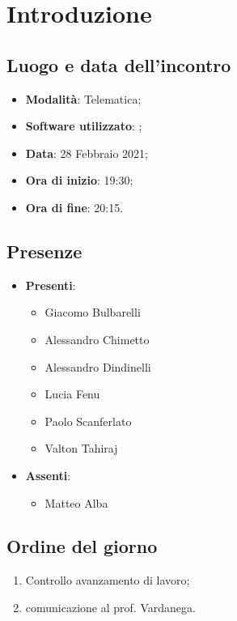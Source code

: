 \documentclass[]{article}
\begin{document}
	
	
	
	\newpage
	
	
		\section{Introduzione}
		\subsection{Luogo e data dell'incontro}
		\begin{itemize}
			\item \textbf{Modalità}: Telematica;
			\item \textbf{Software utilizzato}: ;
			\item \textbf{Data}: 28 Febbraio 2021;
			\item \textbf{Ora di inizio}: 19:30;
			\item \textbf{Ora di fine}: 20:15.
		\end{itemize}

		\subsection{Presenze}
		\begin{itemize}
			\item \textbf{Presenti}:
			\begin{itemize}
				\item Giacomo Bulbarelli
				\item Alessandro Chimetto
				\item Alessandro Dindinelli
				\item Lucia Fenu
				\item Paolo Scanferlato
				\item Valton Tahiraj
			\end{itemize}
			\item \textbf{Assenti}:
			\begin{itemize}
					\item Matteo Alba
			\end{itemize}
		\end{itemize}


		\subsection{Ordine del giorno}
		\begin{enumerate}
			\item Controllo avanzamento di lavoro;
			\item comunicazione al prof. Vardanega.
		\end{enumerate}
\end{document}
